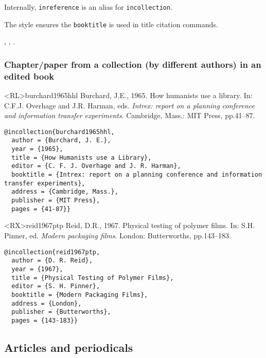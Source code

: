 \documentclass[10pt,a4paper]{article}
\newenvironment{info}{%
  \begin{list}{\makebox[2em][c]{\faInfoCircle}}{%
    \setlength{\leftmargin}{2em}
    \setlength{\labelwidth}{2em}
    \setlength{\labelsep}{0pt}}
}{\end{list}}
\begin{document}
\begin{info}
\item
Internally, \texttt{inreference} is an alias for \texttt{incollection}.
\item
The style ensures the \texttt{booktitle} is used in title citation commands.
\end{info}

\begin{tcblisting}{}
  \cite{aspirin2019bnf}, \citet{bnf2020}, \citet{aspirin2020bnf}.
\end{tcblisting}

\subsubsection*{Chapter\slash paper from a collection (by different authors) in an edited book}

\begin{bibexbox}<RL>{burchard1965hhl}
  Burchard, J.E., 1965. How humanists use a library. In: C.F.J. Overhage and J.R. Harman, eds. \emph{Intrex: report on a planning conference and information transfer experiments}. Cambridge, Mass.: MIT Press, pp.41--87.
  \tcblower
\begin{Verbatim}
@incollection{burchard1965hhl,
  author = {Burchard, J. E.},
  year = {1965},
  title = {How Humanists use a Library},
  editor = {C. F. J. Overhage and J. R. Harman},
  booktitle = {Intrex: report on a planning conference and information transfer experiments},
  address = {Cambridge, Mass.},
  publisher = {MIT Press},
  pages = {41-87}}
\end{Verbatim}
\end{bibexbox}

\begin{bibexbox}<RX>{reid1967ptp}
  Reid, D.R., 1967. Physical testing of polymer films. In: S.H. Pinner, ed. \emph{Modern packaging films}. London: Butterworths, pp.143--183.
  \tcblower
\begin{Verbatim}
@incollection{reid1967ptp,
  author = {D. R. Reid},
  year = {1967},
  title = {Physical Testing of Polymer Films},
  editor = {S. H. Pinner},
  booktitle = {Modern Packaging Films},
  address = {London},
  publisher = {Butterworths},
  pages = {143-183}}
\end{Verbatim}
\end{bibexbox}

\subsection{Articles and periodicals}
\end{document}
